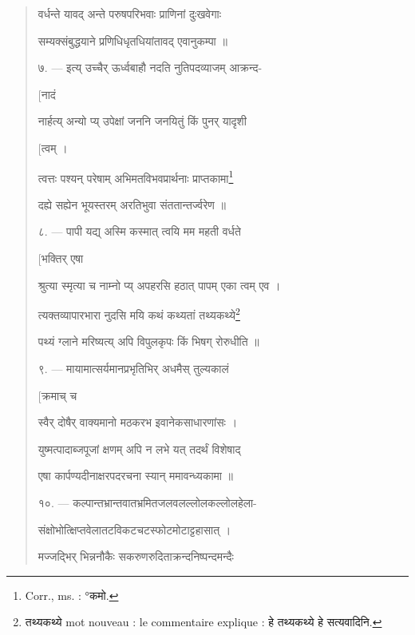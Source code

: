 \documentclass[a4paper, 11pt, oneside, french]{article}
\begin{document}
\begin{quotation}
\texthindi{वर्धन्ते यावद् अन्ते परुषपरिभवाः प्राणिनां दुःखवेगाः}

\texthindi{सम्यक्संबुद्धयाने प्रणिधिधृतधियांतावद् एवानुकम्पा ॥}

\bigskip

\texthindi{७}. --- \texthindi{इत्य् उच्चैर् ऊर्ध्वबाहौ नदति नुतिपदव्याजम् आक्रन्द-}

\hspace*{65mm}\texthindi{[नादं}

\texthindi{नार्हत्य् अन्यो प्य् उपेक्षां जननि जनयितुं किं पुनर् यादृशी}

\hspace*{65mm}\texthindi{[त्वम् ।}

\texthindi{त्वत्तः पश्यन् परेषाम् अभिमतविभवप्रार्थनाः प्राप्तकामा\footnote{Corr., ms. : °\texthindi{कमो}.}}

\texthindi{दह्ये सह्येन भूयस्तरम् अरतिभुवा संततान्तर्ज्वरेण ॥}

\bigskip

\texthindi{८}. --- \texthindi{पापी यद्य् अस्मि कस्मात् त्वयि मम महती वर्धते}

\hspace*{65mm}\texthindi{[भक्तिर् एषा}

\texthindi{श्रुत्या स्मृत्या च नाम्नो प्य् अपहरसि हठात् पापम् एका त्वम् एव ।}

\texthindi{त्यक्तव्यापारभारा नुदसि मयि कथं कथ्यतां तथ्यकथ्ये\footnote{\texthindi{तथ्यकथ्ये} mot nouveau : le commentaire explique : \texthindi{हे तथ्यकथ्ये हे सत्यवादिनि.}}}

\texthindi{पथ्यं ग्लाने मरिष्यत्य् अपि विपुलकृपः किं भिषग् रोरुधीति ॥}

\bigskip

\texthindi{९}. --- \texthindi{मायामात्सर्यमानप्रभृतिभिर् अधमैस् तुल्यकालं}

\hspace*{65mm}\texthindi{[क्रमाच् च}

\texthindi{स्वैर् दोषैर् वाक्यमानो मठकरभ इवानेकसाधारणांसः ।}

\texthindi{युष्मत्पादाब्जपूजां क्षणम् अपि न लभे यत् तदर्थं विशेषाद्}

\texthindi{एषा कार्पण्यदीनाक्षरपदरचना स्यान् ममावन्ध्यकामा ॥}

\bigskip

\texthindi{१०}. --- \texthindi{कल्पान्तभ्रान्तवातभ्रमितजलवलल्लोलकल्लोलहेला-}

\texthindi{संक्षोभोत्क्षिप्तवेलातटविकटचटस्फोटमोटाट्टहासात् ।}

\texthindi{मज्जद्भिर् भिन्ननौकैः सकरुणरुदिताक्रन्दनिष्पन्दमन्दैः}


\end{quotation}
\end{document}
